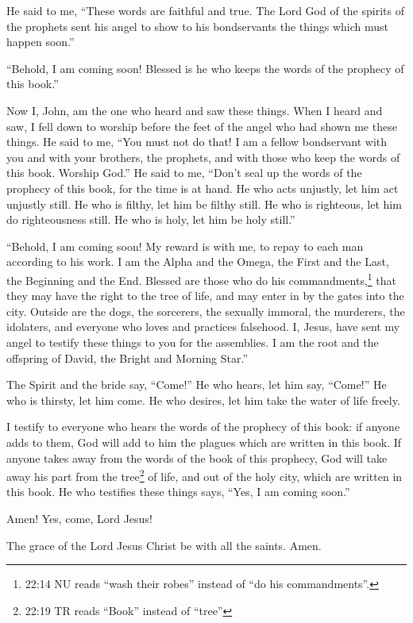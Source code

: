  He said to me, ``These words are faithful and true. The
Lord God of the spirits of the prophets sent his angel to show to his
bondservants the things which must happen soon.''

 ``Behold, I am coming soon! Blessed is he who keeps the
words of the prophecy of this book.''

 Now I, John, am the one who heard and saw these things.
When I heard and saw, I fell down to worship before the feet of the
angel who had shown me these things.  He said to me, ``You
must not do that! I am a fellow bondservant with you and with your
brothers, the prophets, and with those who keep the words of this book.
Worship God.''  He said to me, ``Don't seal up the words of
the prophecy of this book, for the time is at hand.  He who
acts unjustly, let him act unjustly still. He who is filthy, let him be
filthy still. He who is righteous, let him do righteousness still. He
who is holy, let him be holy still.''

 ``Behold, I am coming soon! My reward is with me, to repay
to each man according to his work.  I am the Alpha and the
Omega, the First and the Last, the Beginning and the End. 
Blessed are those who do his commandments,\footnote{22:14 NU reads
  ``wash their robes'' instead of ``do his commandments''.} that they
may have the right to the tree of life, and may enter in by the gates
into the city.  Outside are the dogs, the sorcerers, the
sexually immoral, the murderers, the idolaters, and everyone who loves
and practices falsehood.  I, Jesus, have sent my angel to
testify these things to you for the assemblies. I am the root and the
offspring of David, the Bright and Morning Star.''

 The Spirit and the bride say, ``Come!'' He who hears, let
him say, ``Come!'' He who is thirsty, let him come. He who desires, let
him take the water of life freely.

 I testify to everyone who hears the words of the prophecy
of this book: if anyone adds to them, God will add to him the plagues
which are written in this book.  If anyone takes away from
the words of the book of this prophecy, God will take away his part from
the tree\footnote{22:19 TR reads ``Book'' instead of ``tree''} of life,
and out of the holy city, which are written in this book. 
He who testifies these things says, ``Yes, I am coming soon.''

Amen! Yes, come, Lord Jesus!

 The grace of the Lord Jesus Christ be with all the saints.
Amen.
